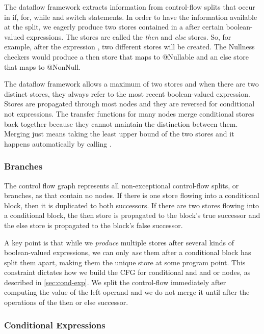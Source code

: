 The dataflow framework extracts information from control-flow splits that occur in if, for, while and switch statements.  In order to have the information available at the split, we eagerly produce two stores contained in a  after certain boolean-valued expressions.  The stores are called the \emph{then} and \emph{else} stores.  So, for example, after the expression , two different stores will be created.  The Nullness checkers would produce a then store that maps  to @Nullable and an else store that maps  to @NonNull.

The dataflow framework allows a maximum of two stores and when there are two distinct stores, they always refer to the most recent boolean-valued expression.  Stores are propagated through most nodes and they are reversed for conditional not expressions.  The transfer functions for many nodes merge conditional stores back together because they cannot maintain the distinction between them.  Merging just means taking the least upper bound of the two stores and it happens automatically by
calling .


\subsubsection{Branches}

The control flow graph represents all non-exceptional control-flow splits, or branches, as  that contain no nodes.  If there is one store flowing into a conditional block, then it is duplicated to both successors.  If there are two stores flowing into a conditional block, the then store is propagated to the block's true successor and the else store is propagated to the block's false successor.

A key point is that while we \emph{produce} multiple stores after several kinds of boolean-valued expressions, we can only \emph{use} them after a conditional block has split them apart, making them the unique store at some program point.  This constraint dictates how we build the CFG for conditional and and or nodes, as described in \autoref{sec:cond-exp}.  We split the control-flow immediately after computing the value of the left operand and we do not merge it until after the operations of the then or else successor.


\subsubsection{Conditional Expressions}
\label{sec:cond-exp}

